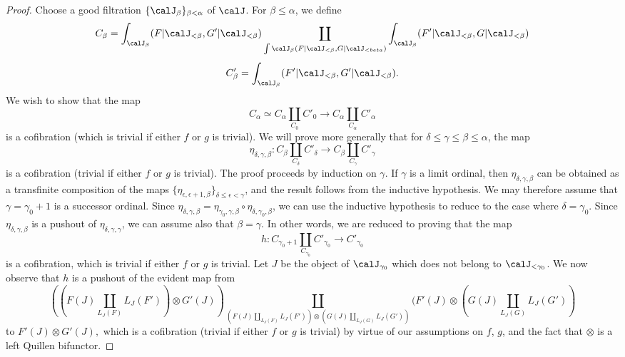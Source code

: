 \begin{Model Categories}
\begin{Didn't Read}
\begin{proof}
Choose a good filtration $\{ \calJ_{\beta} \}_{\beta < \alpha}$ of $\calJ$.
For $\beta \leq \alpha$, we define
$$ C_{\beta} = \int_{ \calJ_{\beta}}( F|\calJ_{<\beta}, G'|\calJ_{<\beta})
\coprod_{ \int{\calJ_{\beta}}(F| \calJ_{<\beta}, G|\calJ_{<beta})} \int_{\calJ_{\beta}}( F'|\calJ_{<\beta}, G| \calJ_{<\beta})$$
$$ C'_{\beta} = \int_{\calJ_{\beta}}( F'| \calJ_{<\beta}, G'| \calJ_{<\beta}).$$
We wish to show that the map 
$$C_{\alpha} \simeq C_{\alpha} \coprod_{ C_0} C'_0 \rightarrow C_{\alpha}
\coprod_{ C_{\alpha} } C'_{\alpha}$$
is a cofibration (which is trivial if either $f$ or $g$ is trivial). We will prove more generally
that for $\delta \leq \gamma \leq \beta \leq \alpha$, the map
$$ \eta_{\delta, \gamma, \beta}: C_{\beta} \coprod_{ C_{\delta} } C'_{\delta} \rightarrow
C_{\beta} \coprod_{ C_{\gamma} } C'_{\gamma}$$
is a cofibration (trivial if either $f$ or $g$ is trivial).
The proof proceeds by induction on $\gamma$. If $\gamma$ is a limit ordinal,
then $\eta_{\delta, \gamma, \beta}$ can be obtained as a transfinite composition of the maps
$\{ \eta_{\epsilon, \epsilon+1, \beta} \}_{ \delta \leq \epsilon < \gamma}$, and the result follows from the inductive hypothesis. We may therefore assume that $\gamma = \gamma_0 +1$ is a successor ordinal. Since $\eta_{\delta, \gamma, \beta} = \eta_{ \gamma_0, \gamma, \beta} \circ \eta_{ \delta, \gamma_0, \beta}$, we can use the inductive hypothesis to reduce to the case where $\delta = \gamma_0$. Since $\eta_{\delta, \gamma, \beta}$ is a pushout of
$\eta_{\delta, \gamma, \gamma}$, we can assume also that $\beta = \gamma$. In other words, we are reduced to proving that the map
$$ h: C_{\gamma_0+1} \coprod_{ C_{\gamma_0} } C'_{\gamma_0} \rightarrow C'_{\gamma_0}$$
is a cofibration, which is trivial if either $f$ or $g$ is trivial. Let $J$ be the object of
$\calJ_{\gamma_0}$ which does not belong to $\calJ_{< \gamma_0}$. We now observe
that $h$ is a pushout of the evident map from
$$ ((F(J) \coprod_{L_J(F)} L_J(F') ) \otimes G'(J))
\coprod_{ (F(J) \coprod_{L_J(F)} L_J(F')) \otimes (G(J) \coprod_{L_J(G)} L_J(G'))}
(F'(J) \otimes (G(J) \coprod_{ L_J(G)} L_J(G'))$$
to $F'(J) \otimes G'(J),$
which is a cofibration (trivial if either $f$ or $g$ is trivial) by virtue of our assumptions on $f$, $g$, and the fact that $\otimes$ is a left Quillen bifunctor.
\end{proof}


\end{Didn't Read}
\end{Model Categories}

